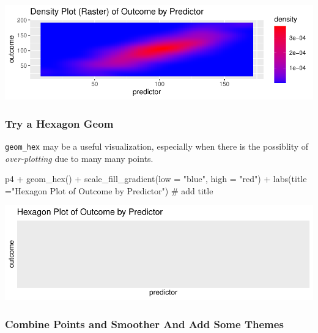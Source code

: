 \documentclass[12pt,]{article}
\newenvironment{Shaded}{}{}
\newcommand{\CommentTok}[1]{\textcolor[rgb]{0.00,0.50,0.00}{#1}}
\newcommand{\DataTypeTok}[1]{#1}
\newcommand{\KeywordTok}[1]{\textcolor[rgb]{0.00,0.00,1.00}{#1}}
\newcommand{\NormalTok}[1]{#1}
\newcommand{\OperatorTok}[1]{#1}
\newcommand{\StringTok}[1]{\textcolor[rgb]{0.00,0.50,0.50}{#1}}
\begin{document}
\includegraphics{introduction-to-ggplot2_files/figure-latex/unnamed-chunk-22-1.pdf}

\hypertarget{try-a-hexagon-geom}{%
\subsubsection{Try a Hexagon Geom}\label{try-a-hexagon-geom}}

\texttt{geom\_hex} may be a useful visualization, especially when there
is the possiblity of \emph{over-plotting} due to many many points.

\begin{Shaded}
\begin{Highlighting}[]
\NormalTok{p4 }\OperatorTok{+}\StringTok{ }
\StringTok{  }\KeywordTok{geom_hex}\NormalTok{() }\OperatorTok{+}
\StringTok{   }\KeywordTok{scale_fill_gradient}\NormalTok{(}\DataTypeTok{low =} \StringTok{"blue"}\NormalTok{,}
                      \DataTypeTok{high =} \StringTok{"red"}\NormalTok{) }\OperatorTok{+}
\StringTok{  }\KeywordTok{labs}\NormalTok{(}\DataTypeTok{title =}\StringTok{"Hexagon Plot of Outcome by Predictor"}\NormalTok{) }\CommentTok{# add title}
\end{Highlighting}
\end{Shaded}

\includegraphics{introduction-to-ggplot2_files/figure-latex/unnamed-chunk-23-1.pdf}

\hypertarget{combine-points-and-smoother-and-add-some-themes}{%
\subsubsection{Combine Points and Smoother And Add Some
Themes}\label{combine-points-and-smoother-and-add-some-themes}}
\end{document}
